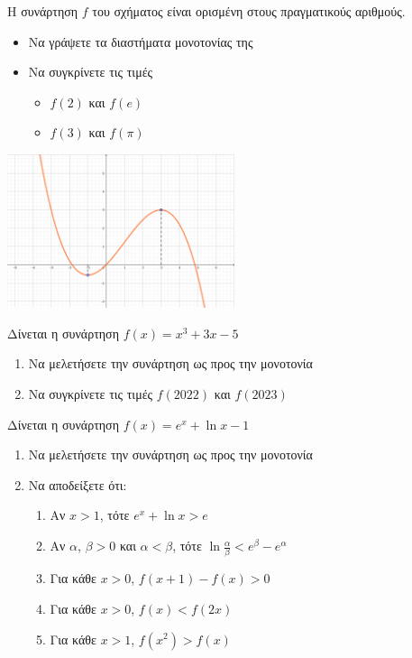 \documentclass{presentation}
\begin{document}
\begin{askisi}
  Η συνάρτηση $f$ του σχήματος είναι ορισμένη στους πραγματικούς αριθμούς.
  \begin{itemize}
    \item Να γράψετε τα διαστήματα μονοτονίας της
    \item Να συγκρίνετε τις τιμές
          \begin{itemize}
            \item $f(2)$ και $f(e)$
            \item $f(3)$ και $f(\pi)$
          \end{itemize}
  \end{itemize}
  \centering
  \includegraphics[width=0.5\textwidth]{"images/1.3 Μονοτονία.png"}
\end{askisi}

\begin{askisi}
  Δίνεται η συνάρτηση $f(x)=x^3+3x-5$
  \begin{enumerate}
    \item Να μελετήσετε την συνάρτηση ως προς την μονοτονία \pause
    \item Να συγκρίνετε τις τιμές $f(2022)$ και $f(2023)$
  \end{enumerate}
\end{askisi}

\begin{askisi}
  Δίνεται η συνάρτηση $f(x)=e^x+\ln x-1$
  \begin{enumerate}
    \item Να μελετήσετε την συνάρτηση ως προς την μονοτονία \pause
    \item Να αποδείξετε ότι:
          \begin{enumerate}
            \item Αν $x>1$, τότε $e^x+\ln x>e$ \pause
            \item Αν $α$, $β>0$ και $α<β$, τότε $\ln \frac{α}{β}<e^β-e^α$ \pause
            \item Για κάθε $x>0$, $f(x+1)-f(x)>0$ \pause
            \item Για κάθε $x>0$, $f(x)<f(2x)$ \pause
            \item Για κάθε $x>1$, $f(x^2)>f(x)$
          \end{enumerate}
  \end{enumerate}
\end{askisi}
\end{document}
